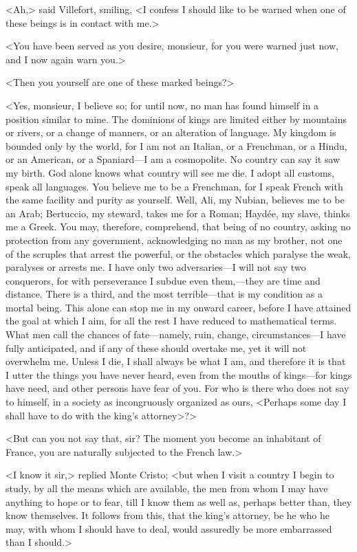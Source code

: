  <Ah,> said Villefort, smiling, <I confess I should like to be warned when one of these beings is in contact with me.> 

 <You have been served as you desire, monsieur, for you were warned just now, and I now again warn you.> 

 <Then you yourself are one of these marked beings?> 

 <Yes, monsieur, I believe so; for until now, no man has found himself in a position similar to mine. The dominions of kings are limited either by mountains or rivers, or a change of manners, or an alteration of language. My kingdom is bounded only by the world, for I am not an Italian, or a Frenchman, or a Hindu, or an American, or a Spaniard—I am a cosmopolite. No country can say it saw my birth. God alone knows what country will see me die. I adopt all customs, speak all languages. You believe me to be a Frenchman, for I speak French with the same facility and purity as yourself. Well, Ali, my Nubian, believes me to be an Arab; Bertuccio, my steward, takes me for a Roman; Haydée, my slave, thinks me a Greek. You may, therefore, comprehend, that being of no country, asking no protection from any government, acknowledging no man as my brother, not one of the scruples that arrest the powerful, or the obstacles which paralyse the weak, paralyses or arrests me. I have only two adversaries—I will not say two conquerors, for with perseverance I subdue even them,—they are time and distance. There is a third, and the most terrible—that is my condition as a mortal being. This alone can stop me in my onward career, before I have attained the goal at which I aim, for all the rest I have reduced to mathematical terms. What men call the chances of fate—namely, ruin, change, circumstances—I have fully anticipated, and if any of these should overtake me, yet it will not overwhelm me. Unless I die, I shall always be what I am, and therefore it is that I utter the things you have never heard, even from the mouths of kings—for kings have need, and other persons have fear of you. For who is there who does not say to himself, in a society as incongruously organized as ours, <Perhaps some day I shall have to do with the king's attorney>?> 

 <But can you not say that, sir? The moment you become an inhabitant of France, you are naturally subjected to the French law.> 

 <I know it sir,> replied Monte Cristo; <but when I visit a country I begin to study, by all the means which are available, the men from whom I may have anything to hope or to fear, till I know them as well as, perhaps better than, they know themselves. It follows from this, that the king's attorney, be he who he may, with whom I should have to deal, would assuredly be more embarrassed than I should.> 

